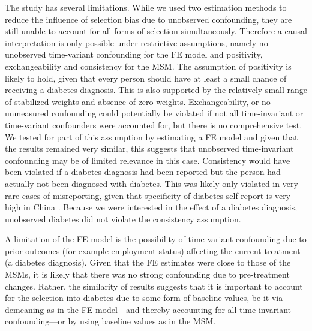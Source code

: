 The study has several limitations. While we used two estimation methods to reduce the influence of selection bias due to unobserved confounding, they are still unable to account for all forms of selection simultaneously. Therefore a causal interpretation is only possible under restrictive assumptions, namely no unobserved time-variant confounding for the \ac{FE} model and positivity, exchangeability and consistency for the \ac{MSM}. The assumption of positivity is likely to hold, given that every person should have at least a small chance of receiving a diabetes diagnosis. This is also supported by the relatively small range of stabilized weights and absence of zero-weights. Exchangeability, or no unmeasured confounding could potentially be violated if not all time-invariant or time-variant confounders were accounted for, but there is no comprehensive test. We tested for part of this assumption by estimating a \ac{FE} model and given that the results remained very similar, this suggests that unobserved time-invariant confounding may be of limited relevance in this case. Consistency would have been violated if a diabetes diagnosis had been reported but the person had actually not been diagnosed with diabetes. This was likely only violated in very rare cases of misreporting, given that specificity of diabetes self-report is very high in China \autocite{Yuan2015}. Because we were interested in the effect of a diabetes diagnosis, unobserved diabetes did not violate the consistency assumption.

A limitation of the \ac{FE} model is the possibility of time-variant confounding due to prior outcomes (for example employment status) affecting the current treatment (a diabetes diagnosis). Given that the \ac{FE} estimates were close to those of the \acp{MSM}, it is likely that there was no strong confounding due to pre-treatment changes. Rather, the similarity of results suggests that it is important to account for the selection into diabetes due to some form of baseline values, be it via demeaning as in the \ac{FE} model---and thereby accounting for all time-invariant confounding---or by using baseline values as in the \ac{MSM}.

